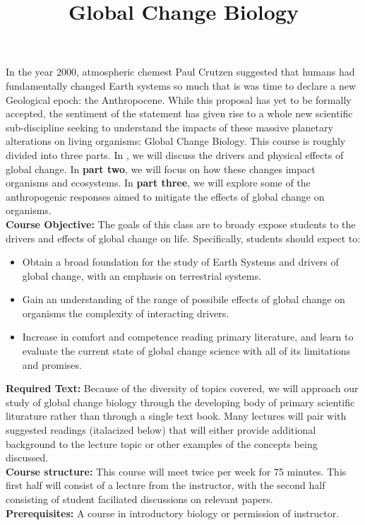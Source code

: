 \documentclass[12pt]{article}\usepackage[]{graphicx}\usepackage[]{color}
\begin{document}
\title{Global Change Biology}
\date{}
\maketitle{}
\indent In the year 2000, atmospheric chemest Paul Crutzen suggested that humans had fundamentally changed Earth systems so much that is was time to declare a new Geological epoch: the Anthropocene. While this proposal has yet to be formally accepted, the sentiment of the statement has given rise to a whole new scientific sub-discipline seeking to understand the impacts of these massive planetary alterations on living organisms: Global Change Biology. This course is roughly divided into three parts. In , we will discuss the drivers and physical effects of global change. In \textbf{part two}, we will focus on how these changes impact organisms and ecosystems. In \textbf{part three}, we will explore some of the anthropogenic responses aimed to mitigate the effects of global change on organisms. \\

\indent\textbf{Course Objective:} The goals of this class are to broady expose students to the drivers and effects of global change on life. Specifically, students should expect to:
\begin{itemize}
\item Obtain a broad foundation for the study of Earth Systems and drivers of global change, with an emphasis on terrestrial systems.
\item Gain an understanding of the range of possibile effects of global change on organisms the complexity of interacting drivers.
\item Increase in comfort and competence reading primary literature, and learn to evaluate the current state of global change science with all of its limitations and promises.
\end{itemize}
\textbf{Required Text:} Because of the diversity of topics covered, we will approach our study of global change biology through the developing body of primary scientific liturature rather than through a single text book. Many lectures will pair with suggested readings (italacized below) that will either provide additional background to the lecture topic or other examples of the concepts being discussed.\\
\textbf{Course structure:} This course will meet twice per week for 75 minutes. This first half will consist of a lecture from the instructor, with the second half consisting of student faciliated discussions on relevant papers.\\
\textbf{Prerequisites:} A course in introductory biology or permission of instructor.\\
\end{document}
